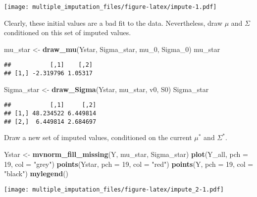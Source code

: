 \documentclass[]{article}
\newenvironment{Shaded}{\begin{snugshade}}{\end{snugshade}}
\newcommand{\DataTypeTok}[1]{\textcolor[rgb]{0.13,0.29,0.53}{#1}}
\newcommand{\DecValTok}[1]{\textcolor[rgb]{0.00,0.00,0.81}{#1}}
\newcommand{\KeywordTok}[1]{\textcolor[rgb]{0.13,0.29,0.53}{\textbf{#1}}}
\newcommand{\NormalTok}[1]{#1}
\newcommand{\StringTok}[1]{\textcolor[rgb]{0.31,0.60,0.02}{#1}}
\begin{document}
\texttt{[image: multiple\_imputation\_files/figure-latex/impute-1.pdf]}

Clearly, these initial values are a bad fit to the data. Nevertheless,
draw \(\mu\) and \(\Sigma\) conditioned on this set of imputed values.

\begin{Shaded}
\begin{Highlighting}[]
\NormalTok{mu_star <-}\StringTok{ }\KeywordTok{draw_mu}\NormalTok{(Ystar, Sigma_star, mu_}\DecValTok{0}\NormalTok{, Sigma_}\DecValTok{0}\NormalTok{)}
\NormalTok{mu_star}
\end{Highlighting}
\end{Shaded}

\begin{verbatim}
##           [,1]    [,2]
## [1,] -2.319796 1.05317
\end{verbatim}

\begin{Shaded}
\begin{Highlighting}[]
\NormalTok{Sigma_star <-}\StringTok{ }\KeywordTok{draw_Sigma}\NormalTok{(Ystar, mu_star, v0, S0)}
\NormalTok{Sigma_star}
\end{Highlighting}
\end{Shaded}

\begin{verbatim}
##           [,1]     [,2]
## [1,] 48.234522 6.449814
## [2,]  6.449814 2.684697
\end{verbatim}

Draw a new set of imputed values, conditioned on the current \(\mu^*\)
and \(\Sigma^*\).

\begin{Shaded}
\begin{Highlighting}[]
\NormalTok{Ystar <-}\StringTok{ }\KeywordTok{mvnorm_fill_missing}\NormalTok{(Y, mu_star, Sigma_star)}
\KeywordTok{plot}\NormalTok{(Y_all, }\DataTypeTok{pch =} \DecValTok{19}\NormalTok{, }\DataTypeTok{col =} \StringTok{"grey"}\NormalTok{)}
\KeywordTok{points}\NormalTok{(Ystar, }\DataTypeTok{pch =} \DecValTok{19}\NormalTok{, }\DataTypeTok{col =} \StringTok{"red"}\NormalTok{)}
\KeywordTok{points}\NormalTok{(Y, }\DataTypeTok{pch =} \DecValTok{19}\NormalTok{, }\DataTypeTok{col =} \StringTok{"black"}\NormalTok{)}
\KeywordTok{mylegend}\NormalTok{()}
\end{Highlighting}
\end{Shaded}

\texttt{[image: multiple\_imputation\_files/figure-latex/impute\_2-1.pdf]}
\end{document}
